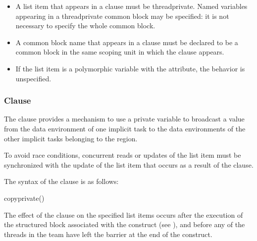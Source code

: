 \begin{fortranspecific}
\begin{itemize}
\item A list item that appears in a  clause must be threadprivate. Named variables
appearing in a threadprivate common block may be specified: it is not necessary to
specify the whole common block.

\item A common block name that appears in a  clause must be declared to be a
common block in the same scoping unit in which the  clause appears.

\item If the list item is a polymorphic variable with the  attribute, the behavior is unspecified.
\end{itemize}
\end{fortranspecific}









\subsubsection{ Clause}
\label{subsubsec:copyprivate clause}
\summary
The  clause provides a mechanism to use a private variable to broadcast
a value from the data environment of one implicit task to the data environments of the
other implicit tasks belonging to the  region.

To avoid race conditions, concurrent reads or updates of the list item must be
synchronized with the update of the list item that occurs as a result of the
 clause.

\syntax
The syntax of the  clause is as follows:

\begin{ompSyntax}
copyprivate()
\end{ompSyntax}

\descr
The effect of the  clause on the specified list items occurs after the
execution of the structured block associated with the  construct (see
),
and before any of the threads in the team have left the barrier
at the end of the construct.

